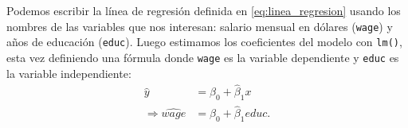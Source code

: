 \documentclass[12pt]{report}\usepackage[]{graphicx}\usepackage[]{color}
\begin{document}





Podemos escribir la línea de regresión definida en \eqref{eq:linea_regresion} usando los nombres de las variables que nos interesan: salario mensual en dólares (\verb|wage|) y años de educación (\verb|educ|). Luego estimamos los coeficientes del modelo con \verb|lm()|, esta vez definiendo una fórmula donde \verb|wage| es la variable dependiente y \verb|educ| es la variable independiente:
\begin{align*}
\hat y &= \hat\beta_0 + \hat\beta_1 x \\
\Longrightarrow \widehat{wage} &= \hat\beta_0 + \hat\beta_1 {educ}.
\end{align*}
\end{document}
